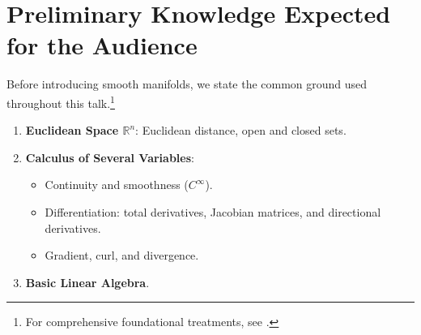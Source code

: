 \section{Preliminary Knowledge Expected for the Audience}
    \label{sec:preliminaries}

    Before introducing smooth manifolds, we state the common ground used
    throughout this talk.\footnote{%
        For comprehensive foundational treatments, see
        \cite{lee2013smooth, tu2011introduction}.}

    \begin{enumerate}
        \item \textbf{Euclidean Space $\mathbb{R}^n$}: Euclidean distance,
            open and closed sets.

        \item \textbf{Calculus of Several Variables}:
        \begin{itemize}
            \item Continuity and smoothness ($C^\infty$).
            \item Differentiation: total derivatives, Jacobian matrices,
                and directional derivatives.
            \item Gradient, curl, and divergence.
        \end{itemize}

        \item \textbf{Basic Linear Algebra}.
    \end{enumerate}

